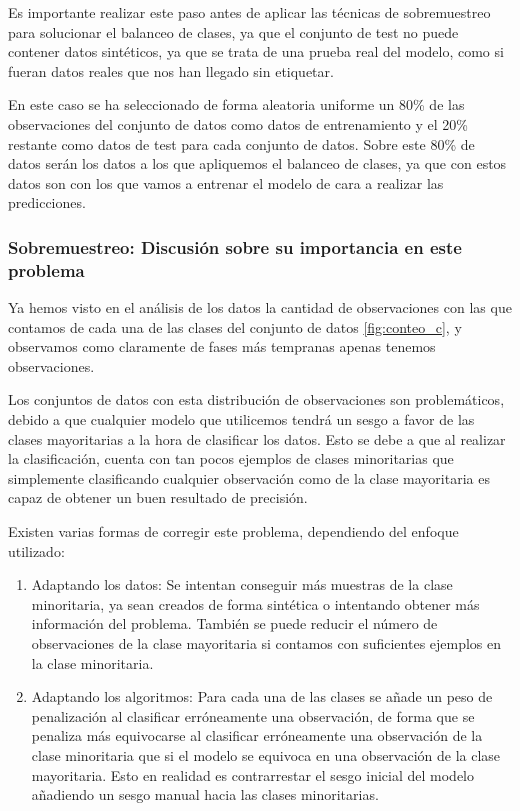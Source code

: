 Es importante realizar este paso antes de aplicar las técnicas de sobremuestreo para solucionar el balanceo de clases, ya que el conjunto de test no puede contener datos sintéticos, ya que se trata de una prueba real del modelo, como si fueran datos reales que nos han llegado sin etiquetar.

En este caso se ha seleccionado de forma aleatoria uniforme un 80\% de las observaciones del conjunto de datos como datos de entrenamiento y el 20\% restante como datos de test para cada conjunto de datos. Sobre este 80\% de datos serán los datos a los que apliquemos el balanceo de clases, ya que con estos datos son con los que vamos a entrenar el modelo de cara a realizar las predicciones.

\newpage

\subsubsection{Sobremuestreo: Discusión sobre su importancia en este problema}

Ya hemos visto en el análisis de los datos la cantidad de observaciones con las que contamos de cada una de las clases del conjunto de datos \ref{fig:conteo_c}, y observamos como claramente de fases más tempranas apenas tenemos observaciones.

Los conjuntos de datos con esta distribución de observaciones son problemáticos, debido a que cualquier modelo que utilicemos tendrá un sesgo a favor de las clases mayoritarias a la hora de clasificar los datos. Esto se debe a que al realizar la clasificación, cuenta con tan pocos ejemplos de clases minoritarias que simplemente clasificando cualquier observación como de la clase mayoritaria es capaz de obtener un buen resultado de precisión.

Existen varias formas de corregir este problema, dependiendo del enfoque utilizado:

\begin{enumerate}
	\item Adaptando los datos: Se intentan conseguir más muestras de la clase minoritaria, ya sean creados de forma sintética o intentando obtener más información del problema. También se puede reducir el número de observaciones de la clase mayoritaria si contamos con suficientes ejemplos en la clase minoritaria.
	\item Adaptando los algoritmos: Para cada una de las clases se añade un peso de penalización al clasificar erróneamente una observación, de forma que se penaliza más equivocarse al clasificar erróneamente una observación de la clase minoritaria que si el modelo se equivoca en una observación de la clase mayoritaria. Esto en realidad es contrarrestar el sesgo inicial del modelo añadiendo un sesgo manual hacia las clases minoritarias.
\end{enumerate}

